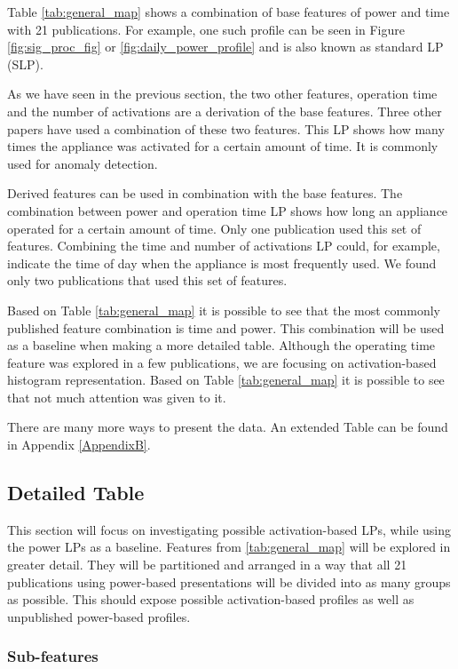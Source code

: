 Table \ref{tab:general_map} shows a combination of base features of power and time with 21 publications. 
For example, one such profile can be seen in Figure \ref{fig:sig_proc_fig} or \ref{fig:daily_power_profile} and is also known as standard LP (SLP).

As we have seen in the previous section, the two other features, operation time and the number of activations are a derivation of the base features.
Three other papers have used a combination of these two features.
This LP shows how many times the appliance was activated for a certain amount of time.
It is commonly used for anomaly detection.

Derived features can be used in combination with the base features.
The combination between power and operation time LP shows how long an appliance operated for a certain amount of time.
Only one publication used this set of features.
Combining the time and number of activations LP could, for example, indicate the time of day when the appliance is most frequently used.
We found only two publications that used this set of features.

Based on Table \ref{tab:general_map} it is possible to see that the most commonly
published feature combination is time and power. This combination will be used 
as a baseline when making a more detailed table. Although the operating time feature was 
explored in a few publications, we are focusing on activation-based histogram representation.
Based on Table \ref{tab:general_map} it is possible to see that not much attention was given to it. 

There are many more ways to present the data. An extended Table can be found in Appendix \ref{AppendixB}.

\subsection{Detailed Table}

This section will focus on investigating possible activation-based LPs, while using the power LPs as a baseline. 
Features from \ref{tab:general_map} will be explored in greater detail. 
They will be partitioned and arranged in a way that all 21 publications using power-based presentations will be divided into as many groups as possible. 
This should expose possible activation-based profiles as well as unpublished power-based profiles.

\subsubsection{Sub-features} \label{sec:subfeatures}

